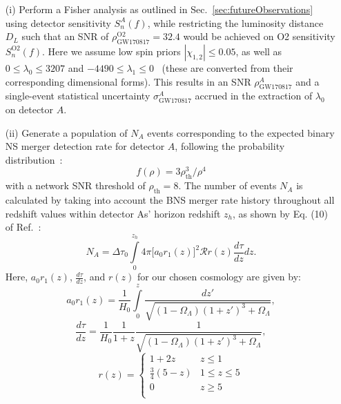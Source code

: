 \documentclass[prd,twocolumn,nofootinbib,superscriptaddress,amsmath,amssymb]{revtex4-1}
\begin{document}
\begin{enumerate}
\item[(i)] Perform a Fisher analysis as outlined in Sec.~\ref{sec:futureObservations} using detector sensitivity $S_n^A(f)$, while restricting the luminosity distance $D_L$ such that an SNR of $\rho^{\text{O2}}_{\text{GW170817}}=32.4$ would be achieved on O2 sensitivity $S_n^{\text{O2}}(f)$.
Here we assume low spin priors $|\chi_{1,2}| \leq 0.05$, as well as $0 \leq \lambda_0 \leq 3207$ and $-4490 \leq \lambda_1 \leq 0$~\cite{delPozzo:TaylorTidal} (these are converted from their corresponding dimensional forms).
This results in an SNR $\rho^A_{\text{GW170817}}$ and a single-event statistical uncertainty $\sigma_\text{GW170817}^A$ accrued in the extraction of $\lambda_0$ on detector $A$.

\item[(ii)] Generate a population of $N_A$ events corresponding to the expected binary NS merger detection rate for detector $A$, following the probability distribution~\cite{Shutz:SNR,Chen:SNR}:
\begin{equation}\label{eq:population}
f(\rho)=3 \rho_{\text{th}}^3/\rho^4
\end{equation}
with a network SNR threshold of $\rho_{\text{th}}=8$.
The number of events $N_A$ is calculated by taking into account the BNS merger rate history throughout all redshift values within detector As' horizon redshift $z_h$, as shown by Eq. (10) of Ref.~\cite{Cutler:BNSmerger}:
\begin{equation}
N_A=\Delta \tau_0 \int\limits^{z_{h}}_0 4 \pi \lbrack  a_0r_1(z)\rbrack^2 \mathcal{R} r(z) \frac{d \tau}{dz} dz.
\end{equation}
Here, $a_0r_1(z)$, $\frac{d\tau}{dz}$, and $r(z)$ for our chosen cosmology are given by:
\begin{equation}
a_0r_1(z) = \frac{1}{H_0}\int\limits^z_0 \frac{dz'}{\sqrt{(1-\Omega_{\Lambda})(1+z')^3+\Omega_{\Lambda}}},
\end{equation}
\begin{equation}
\frac{d\tau}{dz} = \frac{1}{H_0} \frac{1}{1+z}\frac{1}{\sqrt{(1-\Omega_{\Lambda})(1+z')^3+\Omega_{\Lambda}}},
\end{equation}
\begin{equation}
r(z) = \left\{
\begin{array}{ll}
      1+2z & z \leq 1 \\
      \frac{3}{4}(5-z) & 1\leq z\leq 5 \\
      0 & z\geq 5\\ 
\end{array} 
\right.
\end{equation}


\end{enumerate}
\end{document}
